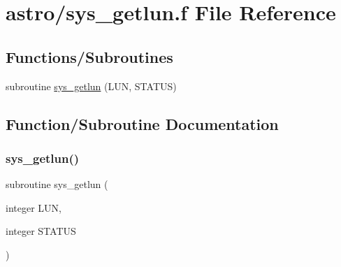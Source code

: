 \hypertarget{astro_2sys__getlun_8f}{}\section{astro/sys\+\_\+getlun.f File Reference}
\label{astro_2sys__getlun_8f}
\subsection*{Functions/\+Subroutines}
\begin{DoxyCompactItemize}
\item 
subroutine \hyperlink{astro_2sys__getlun_8f_aa6de0ee0eb7b66980dc5c8376257dfea}{sys\+\_\+getlun} (L\+UN, S\+T\+A\+T\+US)
\end{DoxyCompactItemize}


\subsection{Function/\+Subroutine Documentation}
\mbox{\label{astro_2sys__getlun_8f_aa6de0ee0eb7b66980dc5c8376257dfea}} 
\subsubsection{\texorpdfstring{sys\+\_\+getlun()}{sys\_getlun()}}
{\footnotesize\ttfamily subroutine sys\+\_\+getlun (\begin{DoxyParamCaption}\item[{integer}]{L\+UN,  }\item[{integer}]{S\+T\+A\+T\+US }\end{DoxyParamCaption})}

